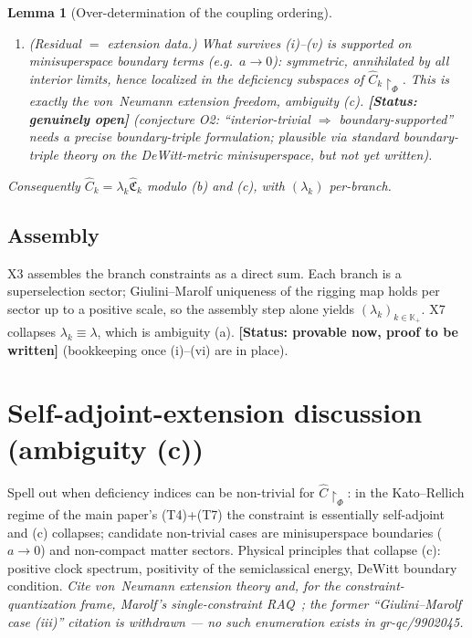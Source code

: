 \documentclass[11pt,a4paper]{article}
\newtheorem{lemma}[theorem]{Lemma}
\theoremstyle{definition}
\theoremstyle{remark}
\newcommand{\KK}{\mathbb{K}}
\newcommand{\PROVABLE}{\textbf{[Status: provable now, proof to be written]}}
\newcommand{\OPEN}{\textbf{[Status: genuinely open]}}
\begin{document}
\begin{lemma}[Over-determination of the coupling
ordering]
\begin{enumerate}[label=\textup{(\roman*)},leftmargin=*,nosep]
    (1-dim and $n$-dim with scalar matter); the lift to the
    midisuperspace/QFT matter content of the main paper is
    \OPEN{} (this is open problem O1, the principal
    conjectural input of the companion paper).
  \item \textup{(Residual $=$ extension data.)} What survives
    (i)--(v) is supported on minisuperspace boundary terms
    (e.g.\ $a\to0$): symmetric, annihilated by all interior
    limits, hence localized in the deficiency subspaces of
    $\widehat C_k\!\restriction_\Phi$. This is exactly the
    von~Neumann extension freedom, ambiguity (c). \OPEN{}
    (conjecture O2: ``interior-trivial $\Rightarrow$
    boundary-supported'' needs a precise boundary-triple
    formulation; plausible via standard boundary-triple theory
    on the DeWitt-metric minisuperspace, but not yet written).
\end{enumerate}
Consequently $\widehat C_k=\lambda_k\widehat{\mathfrak C}_k$
modulo (b) and (c), with $(\lambda_k)$ per-branch.
\end{lemma}

\subsection{Assembly}\label{sec:proof-assembly}

X3 assembles the branch constraints as a direct sum. Each
branch is a superselection sector; Giulini--Marolf
\cite{GiuliniMarolf1999} uniqueness of the rigging map holds
per sector up to a positive scale, so the assembly step alone
yields $(\lambda_k)_{k\in\KK_+}$. X7 collapses
$\lambda_k\equiv\lambda$, which is ambiguity (a). \PROVABLE{}
(bookkeeping once (i)--(vi) are in place).

\section{Self-adjoint-extension discussion (ambiguity
(c))}\label{sec:GM-extension}

Spell out when deficiency indices can be non-trivial for
$\widehat C\!\restriction_\Phi$: in the Kato--Rellich regime of
the main paper's (T4)+(T7) the constraint is essentially
self-adjoint and (c) collapses; candidate non-trivial cases are
minisuperspace boundaries ($a\to0$) and non-compact matter
sectors. Physical principles that collapse (c): positive clock
spectrum, positivity of the semiclassical energy, DeWitt
boundary condition. \emph{Cite von~Neumann extension theory
\cite[Thm.~X.2]{ReedSimonII} and, for the constraint-quantization
frame, Marolf's single-constraint RAQ~\cite{GiuliniMarolf1999};
the former ``Giulini--Marolf case (iii)'' citation is withdrawn
--- no such enumeration exists in gr-qc/9902045.}
\end{document}
